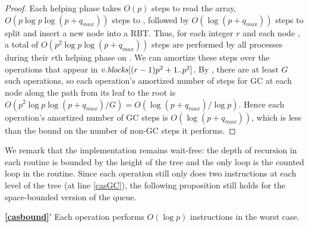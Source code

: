 \begin{proof}
Each helping phase takes $O(p)$ steps to read the  array,
$O(p \log p \log(p+q_{max}))$ steps to ,
followed by $O(\log(p+q_{max}))$ steps to split and insert a new node into a RBT.
Thus, for each integer $r$ and each node , a total of $O(p^2\log p\log(p+q_{max}))$ steps
are performed by all processes during their $r$th helping phase on .
We can amortize these steps over the operations that appear in 
$\mbox{\textnormal{\textit{v}}}.\mbox{\textit{blocks}}[(r-1)p^2+1..p^2]$.
By , there are at least $G$ such operations, 
so each operation's amortized number of steps for GC at each node along the path from its leaf to the root
is $O(p^2\log p\log(p+q_{max})/G)=O(\log(p+q_{max})/\log p)$.
Hence each operation's amortized number of GC steps is $O(\log(p+q_{max}))$, which is less than
the bound on the number of non-GC steps it performs.
\end{proof}

We remark that the implementation remains wait-free:  the depth of recursion in each routine is  bounded
by the height of the tree and the only loop is the counted loop in the  routine.
Since each operation still only does two  instructions at each level of the tree (at line \ref{casGC}), the following proposition still holds for the space-bounded version of the queue.

\begin{customprop}{\bf{\ref{casbound}}$'$}
Each operation performs $O(\log p)$  instructions in the worst case.
\end{customprop}
